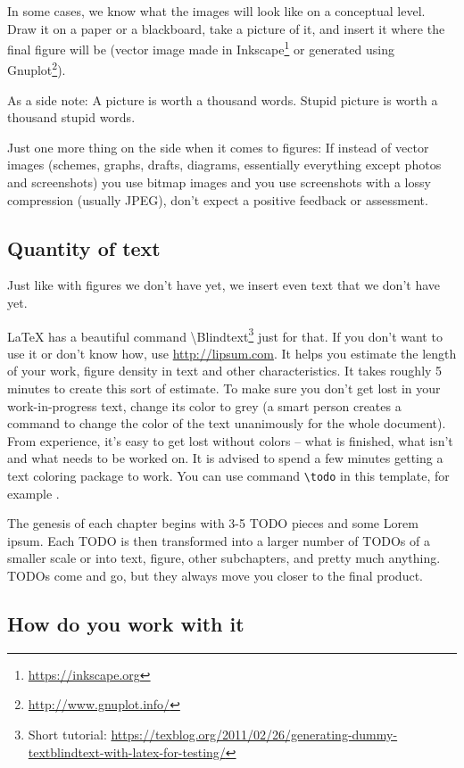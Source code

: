 In some cases, we know what the images will look like on a conceptual level. Draw it on a paper or a blackboard, take a picture of it, and insert it where the final figure will be (vector image made in Inkscape\footnote{\url{https://inkscape.org}} or generated using Gnuplot\footnote{\url{http://www.gnuplot.info/}}). 

As a side note: A picture is worth a thousand words. Stupid picture is worth a thousand stupid words.

Just one more thing on the side when it comes to figures: If instead of vector images (schemes, graphs, drafts, diagrams, essentially everything except photos and screenshots) you use bitmap images and you use screenshots with a lossy compression (usually JPEG), don't expect a positive feedback or assessment.

\subsection*{Quantity of text}

Just like with figures we don't have yet, we insert even text that we don't have yet.

LaTeX has a beautiful command \textbackslash Blindtext\footnote{Short tutorial: \url{https://texblog.org/2011/02/26/generating-dummy-textblindtext-with-latex-for-testing/}} just for that. If you don't want to use it or don't know how, use \url{http://lipsum.com}. It helps you estimate the length of your work, figure density in text and other characteristics. It takes roughly 5 minutes to create this sort of estimate. To make sure you don't get lost in your work-in-progress text, change its color to grey (a smart person creates a command to change the color of the text unanimously for the whole document). From experience, it's easy to get lost without colors -- what is finished, what isn't and what needs to be worked on. It is advised to spend a few minutes getting a text coloring package to work. You can use command \verb|\todo| in this template, for example .

The genesis of each chapter begins with 3-5 TODO pieces and some Lorem ipsum. Each TODO is then transformed into a larger number of TODOs of a smaller scale or into text, figure, other subchapters, and pretty much anything. TODOs come and go, but they always move you closer to the final product.

\subsection*{How do you work with it}

